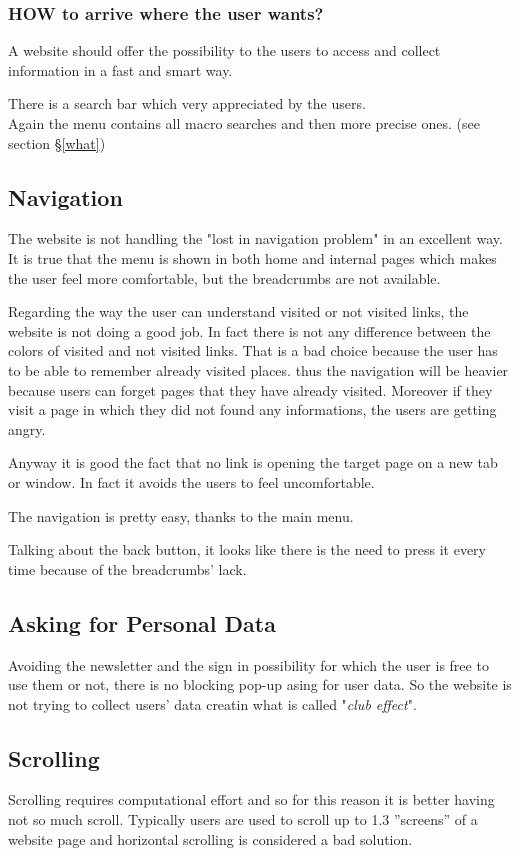 \subsubsection{HOW to arrive where the user wants?}
A website should offer the possibility to the users to access
and collect information in a fast and smart way.

There is a search bar which very appreciated by the users.\\
Again the menu contains all macro searches and then more precise ones. (see section §\ref{what})

\subsection{Navigation}
The website is not handling the "lost in navigation problem" in an excellent way.
It is true that the menu is shown in both home and internal pages which makes
the user feel more comfortable, but the breadcrumbs are not available.

Regarding the way 
the user can understand visited or not visited links, the website is not doing a good job.
In fact there is not any difference
between the colors of visited and not visited links. That is a bad choice because the user has to
be able to remember already visited places. thus the navigation will be heavier because users can forget
pages that they have already visited. Moreover if they visit a page in which they did not found any informations,
the users are getting angry.

Anyway it is good the fact that no link is opening the target page on a
new tab or window. In fact it avoids the users to feel
uncomfortable.

The navigation is pretty easy, thanks to the main menu.

Talking about the
back button, it looks like there is the need to press it every time because of the breadcrumbs' lack.

\subsection{Asking for Personal Data}
Avoiding the newsletter and the sign in possibility for which the user is free to use them or not,
there is no blocking pop-up asing for user data. So the website is not trying to collect users' data creatin
what is called "\textit{club effect}".

\subsection{Scrolling}
Scrolling requires computational effort and so for this reason it is better having not so much scroll.
Typically users are used to scroll up to 1.3 ”screens” of a website page and horizontal scrolling is
considered a bad solution.

